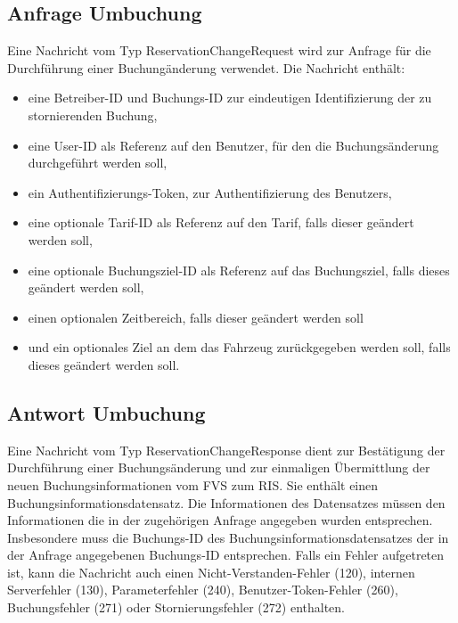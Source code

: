 

\subsection{Anfrage Umbuchung}
Eine Nachricht vom Typ ReservationChangeRequest wird zur Anfrage für die Durchführung einer Buchungänderung verwendet. Die Nachricht enthält:
\begin{itemize}
\item eine Betreiber-ID und Buchungs-ID zur eindeutigen Identifizierung der zu stornierenden Buchung,
\item eine User-ID als Referenz auf den Benutzer, für den die Buchungsänderung durchgeführt werden soll,
\item ein Authentifizierungs-Token, zur Authentifizierung des Benutzers,
\item eine optionale Tarif-ID als Referenz auf den Tarif, falls dieser geändert werden soll,
\item eine optionale Buchungsziel-ID als Referenz auf das Buchungsziel, falls dieses geändert werden soll,
\item einen optionalen Zeitbereich, falls dieser geändert werden soll
\item und ein optionales Ziel an dem das Fahrzeug zurückgegeben werden soll, falls dieses geändert werden soll.
\end{itemize}



\subsection{Antwort Umbuchung}
Eine Nachricht vom Typ ReservationChangeResponse dient zur Bestätigung der Durchführung einer Buchungsänderung und zur einmaligen Übermittlung der neuen Buchungsinformationen vom FVS zum RIS. Sie enthält einen Buchungsinformationsdatensatz. Die Informationen des Datensatzes müssen den Informationen die in der zugehörigen Anfrage angegeben wurden entsprechen. Insbesondere muss die Buchungs-ID des Buchungsinformationsdatensatzes der in der Anfrage angegebenen Buchungs-ID entsprechen. Falls ein Fehler aufgetreten ist, kann die Nachricht auch einen Nicht-Verstanden-Fehler (120), internen Serverfehler (130), Parameterfehler (240), Benutzer-Token-Fehler (260), Buchungsfehler (271) oder Stornierungsfehler (272) enthalten.



